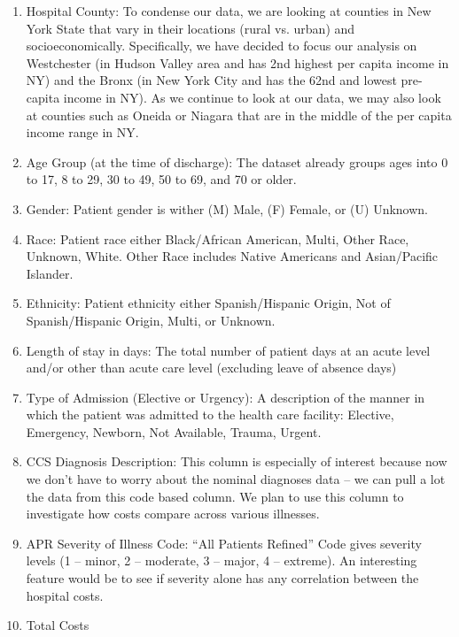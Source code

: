 \documentclass{article}
\begin{document}
\begin{enumerate}
\setlength{\itemsep}{1pt}
  \item Hospital County: To condense our data, we are looking at counties in New York State that vary in their locations (rural vs. urban) and socioeconomically. Specifically, we have decided to focus our analysis on Westchester (in Hudson Valley area and has 2nd highest per capita income in NY) and the Bronx (in New York City and has the 62nd and lowest pre-capita income in NY). As we continue to look at our data, we may also look at counties such as Oneida or Niagara that are in the middle of the per capita income range in NY.
  \item Age Group (at the time of discharge): The dataset already groups ages into 0 to 17, 8 to 29, 30 to 49, 50 to 69, and 70 or older.
  \item Gender: Patient gender is wither (M) Male, (F) Female, or (U) Unknown.
  \item Race: Patient race either Black/African American, Multi, Other Race, Unknown, White. Other Race includes Native Americans and Asian/Pacific Islander.
  \item Ethnicity: Patient ethnicity either Spanish/Hispanic Origin, Not of Spanish/Hispanic Origin, Multi, or Unknown.
  \item  Length of stay in days: The total number of patient days at an acute level and/or other than acute care level (excluding leave of absence days)
  \item Type of Admission (Elective or Urgency): A description of the manner in which the patient was admitted to the health care facility: Elective, Emergency, Newborn, Not Available, Trauma, Urgent.
  \item CCS Diagnosis Description: This column is especially of interest because now we don’t have to worry about the nominal diagnoses data – we can pull a lot the data from this code based column. We plan to use this column to investigate how costs compare across various illnesses. 
  \item APR Severity of Illness Code: “All Patients Refined” Code gives severity levels (1 – minor, 2 – moderate, 3 – major, 4 – extreme). An interesting feature would be to see if severity alone has any correlation between the hospital costs.
  \item Total Costs
\end{enumerate}
\end{document}
